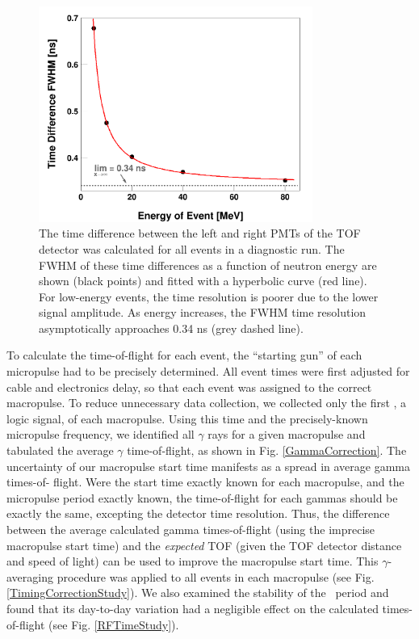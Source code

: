 \begin{figure}[tb]
    \centering
    \includegraphics[width=0.8\textwidth]{figures/DifferenceThresholdsFit.png}
    \caption[Intrinsic time resolution of time-of-flight detector as a function
    of signal amplitude]
    {
        The time difference between the left and right PMTs
        of the TOF detector was calculated for all events in a diagnostic run.
        The FWHM of these time differences as a function of
        neutron energy are shown (black points) and fitted with a hyperbolic
        curve (red line). For low-energy
        events, the time resolution is poorer due to the lower signal amplitude.
        As energy increases, the FWHM time resolution asymptotically approaches 0.34
        ns (grey dashed line).
    }
    \label{DifferenceThresholdsFit}
\end{figure}

To calculate the time-of-flight for each event, the ``starting gun'' of each
micropulse had to be precisely determined. All event times were first adjusted for cable and 
electronics delay, so that each event was assigned to the correct macropulse.
To reduce unnecessary data collection, we collected only the first \tZero, a
logic signal, of each macropulse. 
Using this time and the precisely-known micropulse frequency, we identified all $\gamma$ rays 
for a given macropulse and tabulated
the average $\gamma$ time-of-flight, as shown in Fig. \ref{GammaCorrection}.
The uncertainty of our macropulse start time manifests as a spread in average gamma times-of-
flight. Were the start time exactly known for each macropulse, and the
micropulse period exactly known, the time-of-flight for each gammas should be
exactly the same, excepting the detector time resolution. Thus, the difference between the 
average calculated gamma times-of-flight (using the imprecise macropulse start
time) and the \textit{expected} TOF (given the TOF detector distance and speed of light)
can be used to improve the macropulse start time. This $\gamma$-averaging
procedure was applied to all events in each macropulse (see Fig.
\ref{TimingCorrectionStudy}). We also examined the stability of the \tZero\
period and found that its day-to-day variation had a negligible effect on the
calculated times-of-flight (see Fig. \ref{RFTimeStudy}).

